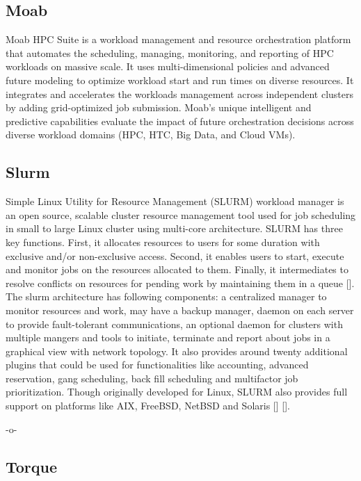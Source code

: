 \subsection{Moab}

Moab HPC Suite is a workload management and resource orchestration
platform that automates the scheduling, managing, monitoring, and
reporting of HPC workloads on massive scale. It uses multi-dimensional
policies and advanced future modeling to optimize workload start and
run times on diverse resources. It integrates and accelerates the
workloads management across independent clusters by adding
grid-optimized job submission. Moab's unique intelligent and
predictive capabilities evaluate the impact of future orchestration
decisions across diverse workload domains (HPC, HTC, Big Data, and
Cloud VMs)\cite{www-moab}.

\subsection{Slurm }

Simple Linux Utility for Resource Management (SLURM) workload manager
is an open source, scalable cluster resource management tool used for
job scheduling in small to large Linux cluster using multi-core
architecture. SLURM has three key functions. First, it allocates
resources to users for some duration with exclusive and/or
non-exclusive access. Second, it enables users to start, execute and
monitor jobs on the resources allocated to them. Finally, it
intermediates to resolve conflicts on resources for pending work by
maintaining them in a queue [\cite{www-slurmSchedmdSite}]. The slurm
architecture has following components: a centralized manager to
monitor resources and work, may have a backup manager, daemon on each
server to provide fault-tolerant communications, an optional daemon
for clusters with multiple mangers and tools to initiate, terminate
and report about jobs in a graphical view with network topology. It
also provides around twenty additional plugins that could be used for
functionalities like accounting, advanced reservation, gang
scheduling, back fill scheduling and multifactor job
prioritization. Though originally developed for Linux, SLURM also
provides full support on platforms like AIX, FreeBSD, NetBSD and
Solaris [\cite{www-slurmPlatformsSite}] [\cite{www-slurm}].

     -o-
     
\subsection{Torque}

